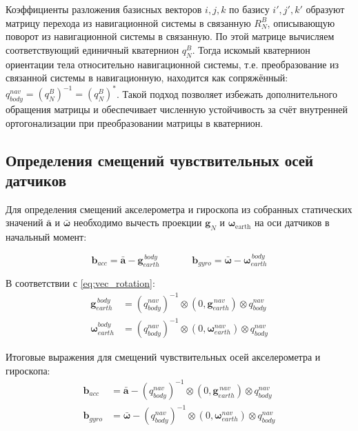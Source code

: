 Коэффициенты разложения базисных векторов $i, j, k$ по базису $i', j', k'$ образуют матрицу перехода из навигационной системы в связанную $R_N^B$, описывающую поворот из навигационной системы в связанную. По этой матрице вычисляем соответствующий единичный кватернион $q_N^B$. Тогда искомый кватернион ориентации тела относительно навигационной системы, т.е. преобразование из связанной системы в навигационную, находится как сопряжённый: $q_{body}^{nav} = \left( q_N^B \right)^{-1} = \left( q_N^B \right)^{*}$. Такой подход позволяет избежать дополнительного обращения матрицы и обеспечивает численную устойчивость за счёт внутренней ортогонализации при преобразовании матрицы в кватернион.


\subsection{Определения смещений чувствительных осей датчиков}

Для определения смещений акселерометра и гироскопа из собранных статических значений $\bm{\bar{a}}$ и $\bm{\bar{\omega}}$ необходимо вычесть проекции $\bm{g}_{N}$ и $\bm{\omega}_{\text{earth}}$ на оси датчиков в начальный момент:

\begin{equation*}
	\bm{b}_{acc} = \bm{\bar{a}} - \bm{g}_{earth}^{\hspace{2pt} body}				\hspace{40pt}
	\bm{b}_{gyro} = \bm{\bar{\omega}} - \bm{\omega}_{earth}^{\hspace{2pt} body}
\end{equation*}

В соответствии с \eqref{eq:vec_rotation}:
\begin{align*}
	\bm{g}_{earth}^{\hspace{2pt} body} &= \left( q_{body}^{nav} \right)^{-1} \otimes
	\left( 0, \bm{g}_{earth}^{\hspace{2pt} nav} \right) \otimes q_{body}^{nav}	\\
	\bm{\omega}_{earth}^{body} &= \left( q_{body}^{nav} \right)^{-1} \otimes
	\left( 0, \bm{\omega}_{earth}^{nav} \right) \otimes q_{body}^{nav}
\end{align*}

Итоговые выражения для смещений чувствительных осей акселерометра и гироскопа:
\begin{align}
	\bm{b}_{acc} &= \bm{\bar{a}} - \left( q_{body}^{nav} \right)^{-1} \otimes
	\left( 0, \bm{g}_{earth}^{\hspace{2pt} nav} \right) \otimes q_{body}^{nav}		\label{eq:bias_acc} \\
	\bm{b}_{gyro} &= \bm{\bar{\omega}} - \left( q_{body}^{nav} \right)^{-1} \otimes
	\left( 0, \bm{\omega}_{earth}^{nav} \right) \otimes q_{body}^{nav}				\label{eq:bias_gyro}
\end{align}


